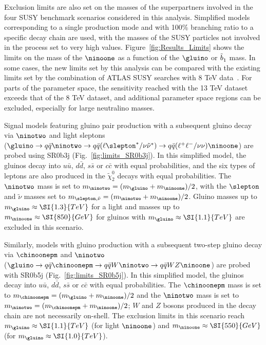 Exclusion limits are also set on the masses of the superpartners involved in the four SUSY benchmark scenarios considered in this analysis. 
Simplified models corresponding to a single production mode and with 100\% branching ratio to a specific decay chain are used, 
with the masses of the SUSY particles not involved in the process set to very high values. 
Figure~\ref{fig:Results_Limits} shows the limits 
on the mass of the $\ninoone$ as a function of the $\gluino$ or $\tilde{b}^{}_1$ mass. 
In some cases, the new limits set by this analysis can be compared 
with the existing limits set by the combination of ATLAS SUSY searches with 8 TeV data~\cite{Aad:2015iea,Aad:2015pfx}. 
For parts of the parameter space, the sensitivity reached with the 13 TeV dataset exceeds that of the 8 TeV dataset,
and additional parameter space regions can be excluded, especially for large neutralino masses. 

Signal models featuring gluino pair production with a subsequent gluino decay via $\ninotwo$ and light sleptons\\ 
($\gluino\to q\bar q\ninotwo\to q\bar q (\ell\slepton^*/\nu\tilde{\nu}^*)\to q\bar q(\ell^+\ell^-/\nu\nu)\ninoone$) 
are probed using SR0b3j (Fig.~\ref{fig:limits_SR0b3j}).
In this simplified model, the gluinos decay into $u\bar u$, $d\bar d$, $s\bar s$ or $c\bar c$ with equal probabilities, 
and the six types of leptons are also produced in the $\tilde\chi_2^0$ decays with equal probabilities. 
The $\ninotwo$ mass is set to $m_{\ninotwo}=(m_{\gluino} + m_{\ninoone})/2$, 
with the $\slepton$ and $\tilde{\nu}$ masses set to $m_{\slepton,\tilde{\nu}}=(m_{\ninotwo} + m_{\ninoone})/2$.
Gluino masses up to $m_{\gluino}\approx\SI{1.3}{TeV}$ for a light \ninoone and \ninoone masses up to $m_{\ninoone}\approx\SI{850}{GeV}$ for gluinos with $m_{\gluino}\approx\SI{1.1}{TeV}$ are excluded in this scenario. 

Similarly, models with gluino production  with a subsequent two-step gluino decay via $\chinoonepm$ and $\ninotwo$\\ 
($\gluino\to q\bar q \chinoonepm \to q\bar q W\ninotwo \to  q\bar q W Z \ninoone$) 
are probed with SR0b5j (Fig.~\ref{fig:limits_SR0b5j}).
In this simplified model, the gluinos decay into $u\bar u$, $d\bar d$, $s\bar s$ or $c\bar c$ with equal probabilities. 
The $\chinoonepm$ mass is set to $m_{\chinoonepm}=(m_{\gluino} + m_{\ninoone})/2$ and
the $\ninotwo$ mass is set to $m_{\ninotwo}=(m_{\chinoonepm} + m_{\ninoone})/2$; 
$W$ and $Z$ bosons produced in the decay chain are not necessarily on-shell. 
The exclusion limits in this scenario reach $m_{\gluino}\approx\SI{1.1}{TeV}$ (for light $\ninoone$) and $m_{\ninoone}\approx\SI{550}{GeV}$ (for $m_{\gluino}\approx\SI{1.0}{TeV}$).

